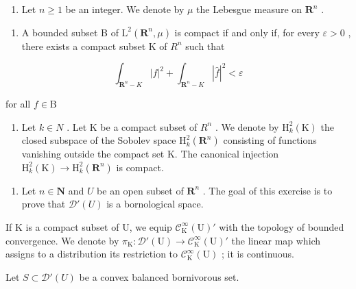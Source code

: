 \begin{enumerate}
\def\labelenumi{\arabic{enumi})}
\setcounter{enumi}{16}
\tightlist
\item
  Let \(n \geqslant 1\) be an integer. We denote by \(\mu\) the Lebesgue measure on \(\mathbf{R}^n\) .
\end{enumerate}

\begin{enumerate}
\def\labelenumi{\alph{enumi})}
\tightlist
\item
  A bounded subset B of \(\mathrm{L}^{2}(\mathbf{R}^{n},\mu)\) is compact if and only if, for every \(\varepsilon>0\) , there exists a compact subset K of \(R^{n}\) such that
\end{enumerate}

\[
\int_ {\mathbf {R} ^ {n} - K} | f | ^ {2} + \int_ {\mathbf {R} ^ {n} - K} | \widehat {f} | ^ {2} <   \varepsilon
\]

for all \(f\in \mathrm{B}\)

\begin{enumerate}
\def\labelenumi{\alph{enumi})}
\setcounter{enumi}{1}
\tightlist
\item
  Let \(k \in N\) . Let K be a compact subset of \(R^{n}\) . We denote by \(\mathrm{H}_{k}^{2}(\mathrm{K})\) the closed subspace of the Sobolev space \(\mathrm{H}_{k}^{2}(\mathbf{R}^{n})\) consisting of functions vanishing outside the compact set K. The canonical injection \(\mathrm{H}_{k}^{2}(\mathrm{K}) \to \mathrm{H}_{k}^{2}(\mathbf{R}^{n})\) is compact.
\end{enumerate}

\begin{enumerate}
\def\labelenumi{\arabic{enumi})}
\setcounter{enumi}{17}
\tightlist
\item
  Let \(n \in \mathbf{N}\) and \(U\) be an open subset of \(\mathbf{R}^n\) . The goal of this exercise is to prove that \(\mathcal{D}'(U)\) is a bornological space.
\end{enumerate}

If K is a compact subset of U, we equip \(\mathcal{C}_{\mathrm{K}}^{\infty}(\mathrm{U})'\) with the topology of bounded convergence. We denote by \(\pi_{\mathrm{K}}\colon\mathcal{D}'(\mathrm{U})\to\mathcal{C}_{\mathrm{K}}^{\infty}(\mathrm{U})'\) the linear map which assigns to a distribution its restriction to \(\mathcal{C}_{\mathrm{K}}^{\infty}(\mathrm{U})\) ; it is continuous.

Let \(S \subset \mathcal{D}'(U)\) be a convex balanced bornivorous set.

